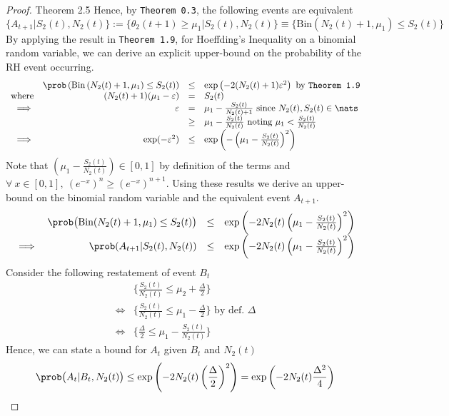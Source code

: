 \documentclass[11pt,a4paper]{article}
\begin{document}
\begin{proof}{Theorem 2.5}
    Hence, by \texttt{Theorem 0.3}, the following events are equivalent
    \[ \big\{A_{t+1}\big|S_2(t),N_2(t)\big\}:= \big\{\theta_2(t+1)\geq\mu_1\big|S_2(t),N_2(t)\big\}\equiv\big\{\text{Bin}(N_2(t)+1,\mu_1)\leq S_2(t)\big\} \]
    By applying the result in \texttt{Theorem 1.9}, for Hoeffding's Inequality on a binomial random variable, we can derive an explicit upper-bound on the probability of the RH event occurring.
    \[\begin{array}{rrcl}
      &\prob\left(\text{Bin}\left(N_2(t)+1,\mu_1\right)\leq S_2(t)\right)&\leq& \exp\left(-2(N_2(t)+1)\varepsilon^2\right)\text{ by \texttt{Theorem 1.9}}\\
      \text{where}&(N_2(t)+1)(\mu_1-\varepsilon)&=&S_2(t)\\
      \implies&\varepsilon&=&\mu_1-\frac{S_2(t)}{N_2(t)+1}\text{ since }N_2(t),S_2(t)\in\nats\\
      &&\geq&\mu_1-\frac{S_2(t)}{N_2(t)}\text{ noting }\mu_1<\frac{S_2(t)}{N_2(t)}\\
      \implies&\exp(-\varepsilon^2)&\leq&\exp\left(-\left(\mu_1-\frac{S_2(t)}{N_2(t)}\right)^2\right)
    \end{array}\]
    Note that $\textstyle\left(\mu_1-\frac{S_2(t)}{N_2(t)}\right)\in[0,1]$ by definition of the terms and ${\forall\ x\in[0,1],\ \left(e^{-x}\right)^n\geq\left(e^{-x}\right)^{n+1}}$. Using these results we derive an upper-bound on the binomial random variable and the equivalent event $A_{t+1}$.
    \[\begin{array}{rrcl}
      &\prob\big(\text{Bin}(N_2(t)+1,\mu_1)\leq S_2(t)\big)&\leq&\exp\left(-2N_2(t)\left(\mu_1-\frac{S_2(t)}{N_2(t)}\right)^2\right)\\
      \implies&\prob(A_{t+1}|S_2(t),N_2(t))&\leq&\exp\left(-2N_2(t)\left(\mu_1-\frac{S_2(t)}{N_2(t)}\right)^2\right)\\
    \end{array}\]
    Consider the following restatement of event $B_t$
    \[\begin{array}{rl}
      &\bigg\{\frac{S_2(t)}{N_2(t)}\leq\mu_2+\frac\Delta2\bigg\}\\
      \Longleftrightarrow&\bigg\{\frac{S_2(t)}{N_2(t)}\leq\mu_1-\frac\Delta2\bigg\}\text{ by def. }\Delta\\
      \Longleftrightarrow&\bigg\{\frac\Delta2\leq\mu_1-\frac{S_2(t)}{N_2(t)}\bigg\}
    \end{array}\]
    Hence, we can state a bound for $A_t$ given $B_t$ and $N_2(t)$
    \[ \prob\big(A_t|B_t,N_2(t)\big)\leq\exp\left(-2N_2(t)\left(\dfrac\Delta2\right)^2\right)=\exp\left(-2N_2(t)\dfrac{\Delta^2}4\right) \]

\end{proof}
\end{document}
